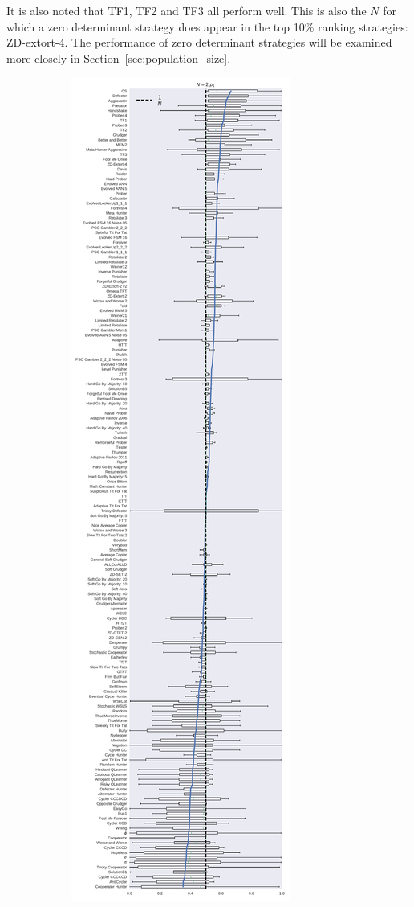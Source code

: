 \documentclass[10pt,journal]{IEEEtran}
\begin{document}
It is also noted that TF1, TF2 and TF3 all perform well. This is also the \(N\)
for which a zero determinant strategy does appear in the top 10\% ranking
strategies: ZD-extort-4. The performance of zero determinant strategies will be
examined more closely in Section~\ref{sec:population_size}.

\begin{figure}[!hbtp]
    \begin{subfigure}{.5\columnwidth}
        \centering
        \includegraphics[width=\columnwidth]{img/boxplot_2_invade.pdf}

\end{subfigure}
\end{figure}
\end{document}
